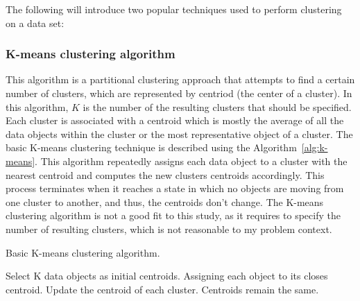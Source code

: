The following will introduce two popular techniques used to perform clustering on a data set:

\subsubsection{K-means clustering algorithm}
This algorithm is a partitional clustering approach that attempts to find a certain number of clusters, which are represented by centriod (the center of a cluster). In this algorithm, ${K}$ is the number of the resulting clusters that should be specified. Each cluster is associated with a centroid  which is mostly the average of all the
data objects within the cluster or the most representative object of a
cluster. The basic K-means clustering technique is described using the Algorithm~\ref{alg:k-means}. This algorithm repeatedly assigns each data object to a cluster with the nearest centroid and computes the new clusters centroids accordingly. This process terminates when it reaches a state in which no objects are moving from one cluster to another, and thus, the centroids don't change.
The K-means clustering algorithm is not a good fit to this study, as it requires to specify the number of resulting clusters, which is not reasonable to my problem context. %


\begin{algorithm}
\caption{Basic K-means clustering algorithm.} \label{alg:k-means}
\begin{algorithmic}[1]
\State Select K data objects as initial centroids.
\Repeat
\State Assigning each object to its closes centroid.
\State Update the centroid of each cluster.
\Until Centroids remain the same.
\end{algorithmic}
\end{algorithm}



